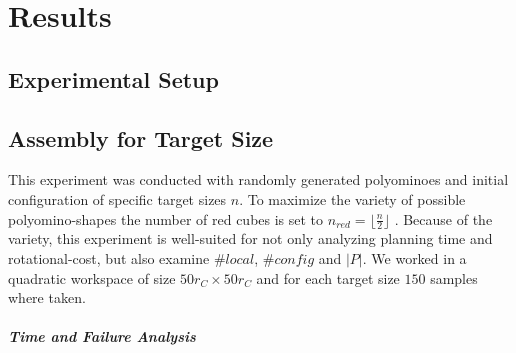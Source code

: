 \chapter{Results}
\label{chap:results}


\section{Experimental Setup}



\section{Assembly for Target Size}

This experiment was conducted with randomly generated polyominoes and initial configuration of specific target sizes $n$.
To maximize the variety of possible polyomino-shapes the number of red cubes is set to $n_\textit{red} = \lfloor \frac{n}{2} \rfloor$ \cite{Lu2021}.
Because of the variety, this experiment is well-suited for not only analyzing planning time and rotational-cost, but also examine $\#\textit{local}$, $\#\textit{config}$ and $|P|$.
We worked in a quadratic workspace of size $50 r_C \times 50 r_C$ and for each target size $150$ samples where taken.

\paragraph{Time and Failure Analysis}

